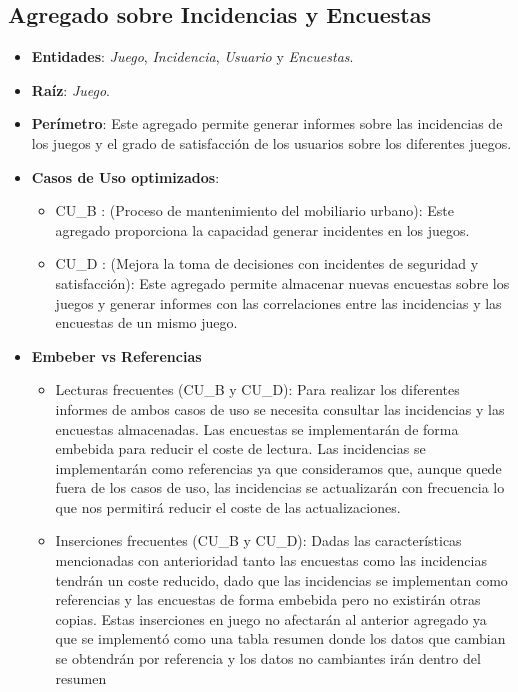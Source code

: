 \documentclass[]{article}
\begin{document}
\subsection{Agregado sobre Incidencias y Encuestas}
\label{sub_sec:agregado_inserciones_encuestas}
\begin{itemize}
    \item \textbf{Entidades}: \textit{Juego}, \textit{Incidencia}, \textit{Usuario} y \textit{Encuestas}.
    \item \textbf{Raíz}: \textit{Juego}.
    \item \textbf{Perímetro}: Este agregado permite generar informes sobre las incidencias de los juegos y el grado de satisfacción de los usuarios sobre los diferentes juegos.
    \item \textbf{Casos de Uso optimizados}:
    \begin{itemize}
        \item CU\_B : (Proceso de mantenimiento del mobiliario urbano): Este agregado proporciona la capacidad generar incidentes en los juegos.
        \item CU\_D : (Mejora la toma de decisiones con incidentes de seguridad y satisfacción): Este agregado permite almacenar nuevas encuestas sobre los juegos y generar informes con las correlaciones entre las incidencias y las encuestas de un mismo juego. 
    \end{itemize}
    \item \textbf{Embeber vs Referencias}
    \begin{itemize}
        \item Lecturas frecuentes (CU\_B y CU\_D): Para realizar los diferentes informes de ambos casos de uso se necesita consultar las incidencias y las encuestas almacenadas. Las encuestas se implementarán de forma embebida para reducir el coste de lectura. Las incidencias se implementarán como referencias ya que consideramos que, aunque quede fuera de los casos de uso, las incidencias se actualizarán con frecuencia lo que nos permitirá reducir el coste de las actualizaciones. 
        \item Inserciones frecuentes (CU\_B y CU\_D): Dadas las características mencionadas con anterioridad tanto las encuestas como las incidencias tendrán un coste reducido, dado que las incidencias se implementan como referencias y las encuestas de forma embebida pero no existirán otras copias. Estas inserciones en juego no afectarán al anterior agregado ya que se implementó como una tabla resumen donde los datos que cambian se obtendrán por referencia y los datos no cambiantes irán dentro del resumen
    \end{itemize}
\end{itemize}
\end{document}
